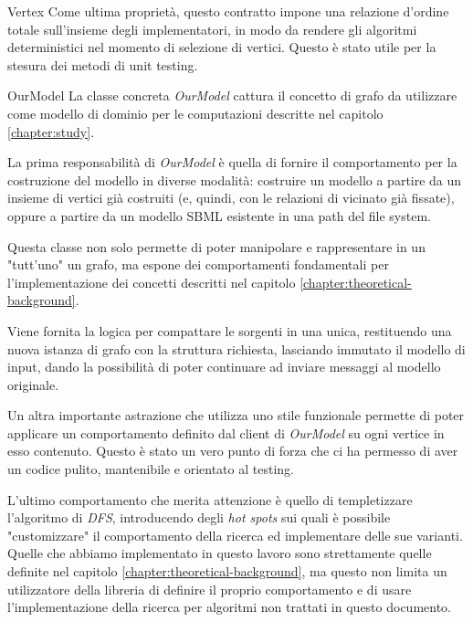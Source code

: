 \begin{paragraph}{Vertex}
  Come ultima propriet\`a, questo contratto impone una relazione
  d'ordine totale sull'insieme degli implementatori, in modo da
  rendere gli algoritmi deterministici nel momento di selezione di
  vertici. Questo \`e stato utile per la stesura dei metodi di unit
  testing.

\end{paragraph}

\begin{paragraph}{OurModel}
  La classe concreta \emph{OurModel} cattura il concetto di grafo da
  utilizzare come modello di dominio per le computazioni descritte nel
  capitolo \ref{chapter:study}.

  La prima responsabilit\`a di \emph{OurModel} \`e quella di fornire
  il comportamento per la costruzione del modello in diverse
  modalit\`a: costruire un modello a partire da un insieme di vertici
  gi\`a costruiti (e, quindi, con le relazioni di vicinato gi\`a
  fissate), oppure a partire da un modello SBML esistente in una path
  del file system.

  Questa classe non solo permette di poter manipolare e rappresentare
  in un "tutt'uno" un grafo, ma espone dei comportamenti fondamentali
  per l'implementazione dei concetti descritti nel capitolo
  \ref{chapter:theoretical-background}.

  Viene fornita la logica per compattare le sorgenti in una unica,
  restituendo una nuova istanza di grafo con la struttura richiesta,
  lasciando immutato il modello di input, dando la possibilit\`a di
  poter continuare ad inviare messaggi al modello originale.

  Un altra importante astrazione che utilizza uno stile funzionale
  permette di poter applicare un comportamento definito dal client di
  \emph{OurModel} su ogni vertice in esso contenuto. Questo \`e stato
  un vero punto di forza che ci ha permesso di aver un codice pulito,
  mantenibile e orientato al testing.

  L'ultimo comportamento che merita attenzione \`e quello di
  templetizzare l'algoritmo di \emph{DFS}, introducendo degli
  \emph{hot spots} sui quali \`e possibile "customizzare" il
  comportamento della ricerca ed implementare delle sue
  varianti. Quelle che abbiamo implementato in questo lavoro sono
  strettamente quelle definite nel capitolo
  \ref{chapter:theoretical-background}, ma questo non limita un
  utilizzatore della libreria di definire il proprio comportamento e
  di usare l'implementazione della ricerca per algoritmi non trattati
  in questo documento.

\end{paragraph}

